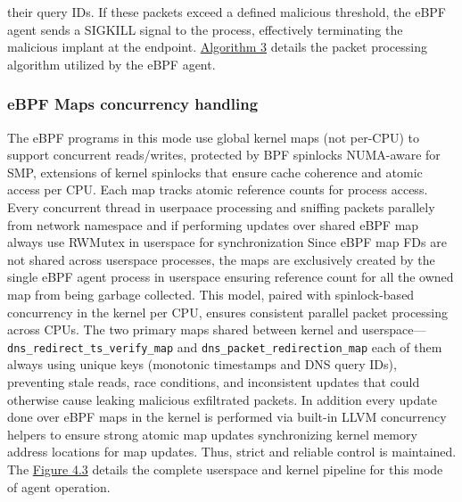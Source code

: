 \documentclass [11pt, proquest] {uwthesis}[2020/02/24]
\begin{document}
their query IDs. If these packets exceed a defined malicious threshold, the eBPF agent sends a SIGKILL signal to the process, effectively terminating the malicious implant at the endpoint.
\hyperref[sec:alg3]{Algorithm 3} details the packet processing algorithm utilized by the eBPF agent.


\subsubsection{\textbf{eBPF Maps concurrency handling}}
\label{active:sec3}
The eBPF programs in this mode use global kernel maps (not per-CPU) to support concurrent reads/writes, protected by BPF spinlocks NUMA-aware for SMP, extensions of kernel spinlocks that ensure cache coherence and atomic access per CPU. Each map tracks atomic reference counts for process access. Every concurrent thread in userpaace processing and sniffing packets parallely from network namespace and if performing updates over shared eBPF map always use RWMutex in userspace for synchronization Since eBPF map FDs are not shared across userspace processes, the maps are exclusively created by the single eBPF agent process in userspace ensuring reference count for all the owned map from being garbage collected. This model, paired with spinlock-based concurrency in the kernel per CPU, ensures consistent parallel packet processing across CPUs. The two primary maps shared between kernel and userspace—\texttt{dns\_redirect\_ts\_verify\_map} and \texttt{dns\_packet\_redirection\_map} each of them always using unique keys (monotonic timestamps and DNS query IDs), preventing stale reads, race conditions, and inconsistent updates that could otherwise cause leaking malicious exfiltrated packets. In addition every update done over eBPF maps in the kernel is performed via built-in LLVM concurrency helpers to ensure strong atomic map updates synchronizing kernel memory address locations for map updates. Thus, strict and reliable control is maintained. The \hyperref[sec:dp-active-phase]{Figure 4.3} details the complete userspace and kernel pipeline for this mode of agent operation. 
\end{document}
